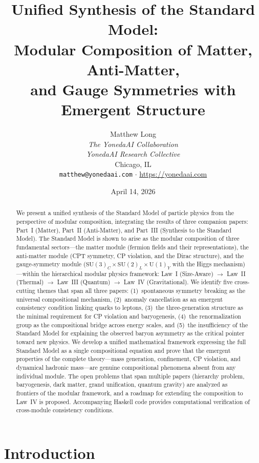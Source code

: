 \documentclass[12pt]{article}
\title{\textbf{Unified Synthesis of the Standard Model:\\[6pt]
Modular Composition of Matter, Anti-Matter,\\[4pt]
and Gauge Symmetries with Emergent Structure}}
\author{Matthew Long \\
\textit{The YonedaAI Collaboration} \\
\textit{YonedaAI Research Collective} \\
Chicago, IL \\
\texttt{matthew@yonedaai.com} $\cdot$ \url{https://yonedaai.com}}
\date{April 14, 2026}
\theoremstyle{definition}
\theoremstyle{remark}
\newcommand{\su}[1]{\mathrm{SU}(#1)}
\newcommand{\uu}[1]{\mathrm{U}(#1)}
\begin{document}
\maketitle

\begin{abstract}
We present a unified synthesis of the Standard Model of particle physics from the perspective of modular composition, integrating the results of three companion papers: Part~I (Matter), Part~II (Anti-Matter), and Part~III (Synthesis to the Standard Model). The Standard Model is shown to arise as the modular composition of three fundamental sectors---the matter module (fermion fields and their representations), the anti-matter module (CPT symmetry, CP violation, and the Dirac structure), and the gauge-symmetry module ($\su{3}_C \times \su{2}_L \times \uu{1}_Y$ with the Higgs mechanism)---within the hierarchical modular physics framework: Law~I (Size-Aware) $\to$ Law~II (Thermal) $\to$ Law~III (Quantum) $\to$ Law~IV (Gravitational). We identify five cross-cutting themes that span all three papers: (1)~spontaneous symmetry breaking as the universal compositional mechanism, (2)~anomaly cancellation as an emergent consistency condition linking quarks to leptons, (3)~the three-generation structure as the minimal requirement for CP violation and baryogenesis, (4)~the renormalization group as the compositional bridge across energy scales, and (5)~the insufficiency of the Standard Model for explaining the observed baryon asymmetry as the critical pointer toward new physics. We develop a unified mathematical framework expressing the full Standard Model as a single compositional equation and prove that the emergent properties of the complete theory---mass generation, confinement, CP violation, and dynamical hadronic mass---are genuine compositional phenomena absent from any individual module. The open problems that span multiple papers (hierarchy problem, baryogenesis, dark matter, grand unification, quantum gravity) are analyzed as frontiers of the modular framework, and a roadmap for extending the composition to Law~IV is proposed. Accompanying Haskell code provides computational verification of cross-module consistency conditions.
\end{abstract}

\tableofcontents
\newpage

\section{Introduction}
\label{sec:introduction}
\end{document}

